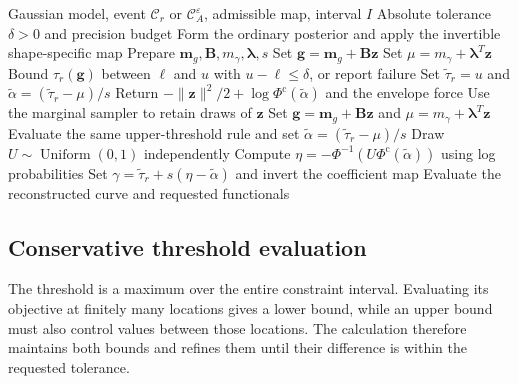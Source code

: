 \begin{algorithm}[htbp]
\caption{Sign-constrained marginal sampling and reconstruction.
For a joint event satisfying \cref{prop:joint}, use its common
coefficient map and replace $\tau_r$ by $\tau_A^\varepsilon$
throughout, including the upper threshold used in both stages.}
\label{alg:posterior}
\begin{algorithmic}[1]
\Require Gaussian model, event $\mathcal C_r$ or $\mathcal C_A^\varepsilon$, admissible map, interval $I$
\Require Absolute tolerance $\delta>0$ and precision budget
\State Form the ordinary posterior and apply the invertible shape-specific map
\State Prepare $\boldsymbol m_g,\boldsymbol B,m_\gamma,\boldsymbol\lambda,s$
 \State Set $\boldsymbol g=\boldsymbol m_g+\boldsymbol B\boldsymbol z$
 \State Set $\mu=m_\gamma+\boldsymbol\lambda^T\boldsymbol z$
 \State Bound $\tau_r(\boldsymbol g)$ between $\ell$ and $u$ with $u-\ell\leq\delta$, or report failure
 \State Set $\widetilde\tau_r=u$ and $\widetilde\alpha=(\widetilde\tau_r-\mu)/s$
 \State Return $-\|\boldsymbol z\|^2/2+\log\Phi^{\mathrm c}(\widetilde\alpha)$ and the envelope force
\EndFunction
\State Use the marginal sampler to retain draws of $\boldsymbol z$
 \State Set $\boldsymbol g=\boldsymbol m_g+\boldsymbol B\boldsymbol z$ and $\mu=m_\gamma+\boldsymbol\lambda^T\boldsymbol z$
 \State Evaluate the same upper-threshold rule and set $\widetilde\alpha=(\widetilde\tau_r-\mu)/s$
 \State Draw $U\sim\operatorname{Uniform}(0,1)$ independently
 \State Compute $\eta=-\Phi^{-1}(U\Phi^{\mathrm c}(\widetilde\alpha))$ using log probabilities
 \State Set $\gamma=\widetilde\tau_r+s(\eta-\widetilde\alpha)$ and invert the coefficient map
 \State Evaluate the reconstructed curve and requested functionals
\EndFor
\end{algorithmic}
\end{algorithm}

\subsection{Conservative threshold evaluation}
\label{subsec:threshold-computation}

The threshold is a maximum over the entire constraint interval.
Evaluating its objective at finitely many locations gives a lower
bound, while an upper bound must also control values between those
locations. The calculation therefore maintains both bounds and
refines them until their difference is within the requested tolerance.

